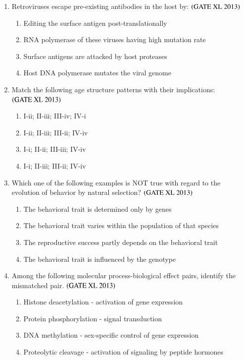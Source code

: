 \documentclass[journal]{IEEEtran}
\begin{document}
\begin{enumerate}
\item Retroviruses escape pre-existing antibodies in the host by: \hfill $\left(\text{GATE XL 2013}\right)$
\begin{enumerate}
    \item Editing the surface antigen post-translationally
    \item RNA polymerase of these viruses having high mutation rate
    \item Surface antigens are attacked by host proteases
    \item Host DNA polymerase mutates the viral genome
\end{enumerate}

\item Match the following age structure patterns with their implications: \hfill $\left(\text{GATE XL 2013}\right)$
\begin{enumerate}
    \item I-ii; II-iii; III-iv; IV-i
    \item I-ii; II-iii; III-ii; IV-iv
    \item I-i; II-ii; III-iii; IV-iv
    \item I-i; II-iii; III-ii; IV-iv
\end{enumerate}

\item Which one of the following examples is NOT true with regard to the evolution of behavior by natural selection? \hfill $\left(\text{GATE XL 2013}\right)$
\begin{enumerate}
    \item The behavioral trait is determined only by genes
    \item The behavioral trait varies within the population of that species
    \item The reproductive success partly depends on the behavioral trait
    \item The behavioral trait is influenced by the genotype
\end{enumerate}

\item Among the following molecular process-biological effect pairs, identify the mismatched pair. \hfill $\left(\text{GATE XL 2013}\right)$
\begin{enumerate}
    \item Histone deacetylation - activation of gene expression
    \item Protein phosphorylation - signal transduction
    \item DNA methylation - sex-specific control of gene expression
    \item Proteolytic cleavage - activation of signaling by peptide hormones
\end{enumerate}


\end{enumerate}
\end{document}
